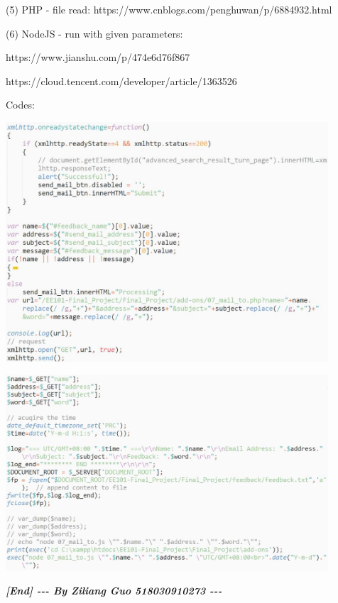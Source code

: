 \documentclass[10pt,twoside,a4paper,titlepage]{article}
\begin{document}
		\indent\indent(5) PHP - file read: https://www.cnblogs.com/penghuwan/p/6884932.html\par
		\indent\indent(6) NodeJS - run with given parameters:\par
			\indent\indent\indent https://www.jianshu.com/p/474e6d76f867\par
			\indent\indent\indent https://cloud.tencent.com/developer/article/1363526\newline\par
		\newpage
		Codes:\newline\par
		\includegraphics[width=0.9\textwidth]{gzl/12.jpg}\newline\par
		\includegraphics[width=0.9\textwidth]{gzl/13.jpg}\newline\par

	\textbf{\emph{[End] -{}-{}- By Ziliang Guo 518030910273 -{}-{}-}}
\end{document}
